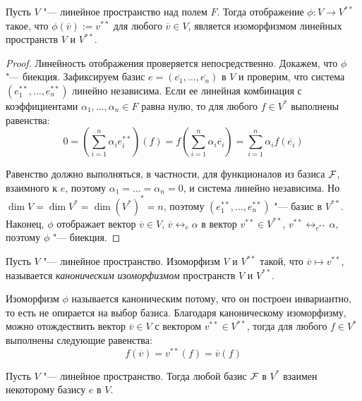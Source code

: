 \begin{theorem}
	Пусть $V$ "--- линейное пространство над полем $F$. Тогда отображение $\phi: V \rightarrow V^{**}$ такое, что $\phi(\overline{v}) := v^{**}$ для любого $\overline v \in V$, является изоморфизмом линейных пространств $V$ и $V^{**}$.
\end{theorem}

\begin{proof}
	Линейность отображения проверяется непосредственно. Докажем, что $\phi$ "--- биекция. Зафиксируем базис $e = (\overline{e_1}, \dots, \overline{e_n})$ в $V$ и проверим, что система $(e_1^{**}, \dots, e_n^{**})$ линейно независима. Если ее линейная комбинация с коэффициентами $\alpha_1, \dotsc, \alpha_n \in F$ равна нулю, то для любого $f \in V^*$ выполнены равенства:
	\[0 = \left(\sum_{i = 1}^{n}\alpha_ie_i^{**}\right)(f) = f\left(\sum_{i = 1}^n\alpha_i\overline{e_i}\right) = \sum_{i = 1}^n\alpha_if(\overline{e_i})\]
	
	Равенство должно выполняться, в частности, для функционалов из базиса $\FF $, взаимного к $e$, поэтому $\alpha_1 = \dots = \alpha_n = 0$, и система линейно независима. Но $\dim{V} = \dim{V^*} = \dim{(V^*)^*} = n$, поэтому $(e_1^{**}, \dots, e_n^{**})$ "--- базис в $V^{**}$. Наконец, $\phi$ отображает вектор $\overline{v} \in V$, $\overline{v} \leftrightarrow_{e} \alpha$ в вектор $v^{**} \in V^{**}$, $v^{**} \leftrightarrow_{e^{**}} \alpha$, поэтому $\phi$ "--- биекция.
\end{proof}

\begin{definition}
	Пусть $V$ "--- линейное пространство. Изоморфизм $V$ и $V^{**}$ такой, что $\overline{v} \mapsto v^{**}$, называется \textit{каноническим изоморфизмом} пространств $V$ и $V^{**}$.
\end{definition}

\begin{note}
	Изоморфизм $\phi$ называется каноническим потому, что он построен инвариантно, то есть не опирается на выбор базиса. Благодаря каноническому изоморфизму, можно отождествить вектор $\overline{v} \in V$ с вектором $v^{**} \in V^{**}$, тогда для любого $f \in V^*$ выполнены следующие равенства:
	\[f(\overline{v}) = v^{**}(f) = \overline{v}(f)\]
\end{note}

\begin{proposition}
	Пусть $V$ "--- линейное пространство. Тогда любой базис $\FF $ в $V^*$ взаимен некоторому базису $e$ в $V$.
\end{proposition}

